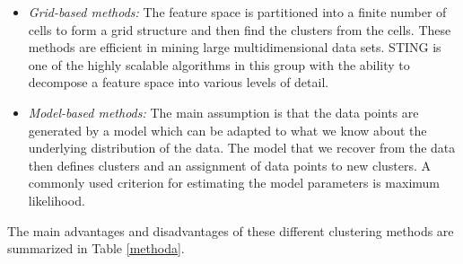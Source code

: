 \begin{itemize}
    
    \item\textit{Grid-based methods:} %
    The feature space is partitioned into a finite number of cells to form a grid structure and then find the clusters from the cells. These methods are efficient in mining large multidimensional data sets. STING is one of the highly scalable algorithms in this group with the ability to decompose a feature space into various levels of detail. 
   
    \item\textit{Model-based methods:} The main assumption is that the data points are generated by a model which can be adapted to what we know about the underlying distribution of the data. The model that we recover from the data then defines clusters and an assignment of data points to new clusters. A commonly used criterion for estimating the model parameters is maximum likelihood.
    
\end{itemize}

The main advantages and disadvantages of these different clustering methods are summarized in Table \ref{methoda}. 

